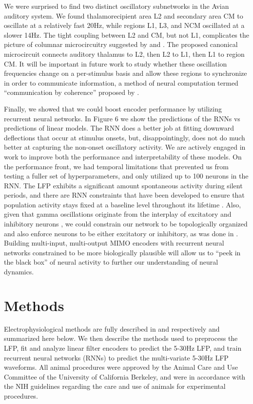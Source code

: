 We were surprised to find two distinct oscillatory subnetworks in the Avian auditory system. We found thalamorecipient area L2 and secondary area CM to oscillate at a relatively fast 20Hz, while regions L1, L3, and NCM oscillated at a slower 14Hz. The tight coupling between L2 and CM, but not L1, complicates the picture of columnar microcircuitry suggested by \cite{Wang2010} and \cite{Calabrese2015}. The proposed canonical microcircuit connects auditory thalamus to L2, then L2 to L1, then L1 to region CM. It will be important in future work to study whether these oscillation frequencies change on a per-stimulus basis and allow these regions to synchronize in order to communicate information, a method of neural computation termed ``communication by coherence'' proposed by \cite{Fries2005}.

Finally, we showed that we could boost encoder performance by utilizing recurrent neural networks. In Figure 6 we show the predictions of the RNNs vs predictions of linear models. The RNN does a better job at fitting downward deflections that occur at stimulus onsets, but, disappointingly, does not do much better at capturing the non-onset oscillatory activity. We are actively engaged in work to improve both the performance and interpretability of these models. On the performance front, we had temporal limitations that prevented us from testing a fuller set of hyperparameters, and only utilized up to 100 neurons in the RNN. The LFP exhibits a significant amount spontaneous activity during silent periods, and there are RNN constraints that have been developed to ensure that population activity stays fixed at a baseline level throughout its lifetime \cite{Krueger2015}. Also, given that gamma oscillations originate from the interplay of excitatory and inhibitory neurons \cite{Buzsaki2012a}, we could constrain our network to be topologically organized and also enforce neurons to be either excitatory or inhibitory, as was done in \cite{Song2016}. Building multi-input, multi-output MIMO encoders with recurrent neural networks constrained to be more biologically plausible will allow us to ``peek in the black box'' of neural activity to further our understanding of neural dynamics.


\section{Methods}


Electrophysiological methods are fully described in \cite{Elie2015a} and \cite{Elie2015b} respectively and summarized here below. We then describe the methods used to preprocess the LFP, fit and analyze linear filter encoders to predict the 5-30Hz LFP, and train recurrent neural networks (RNNs) to predict the multi-variate 5-30Hz LFP waveforms. All animal procedures were approved by the Animal Care and Use Committee of the University of California Berkeley, and were in accordance with the NIH guidelines regarding the care and use of animals for experimental procedures.

